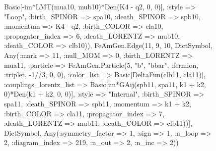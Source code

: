 \documentclass{revtex4}
\begin{document}
\begin{figure}[!htb]
\begin{center}
{Basic[-im*LMT(mua10, mub10)*Den(K4 - q2, 0, 0)], :style => "Loop", :birth_SPINOR => spa10, :death_SPINOR => spb10, :momentum => K4 - q2, :birth_COLOR => cla10, :propagator_index => 6, :death_LORENTZ => mub10, :death_COLOR => clb10)), FeAmGen.Edge(11, 9, 10, Dict{Symbol, Any}(:mark => 11, :null_MOM => 0, :birth_LORENTZ => mua11, :particle => FeAmGen.Particle(5, "b", "bbar", :fermion, :triplet, -1//3, 0, 0), :color_list => Basic[DeltaFun(clb11, cla11)], :couplings_lorentz_list => Basic[im*GAij(spb11, spa11, k1 + k2, 0)*Den(k1 + k2, 0, 0)], :style => "Internal", :birth_SPINOR => spa11, :death_SPINOR => spb11, :momentum => k1 + k2, :birth_COLOR => cla11, :propagator_index => 7, :death_LORENTZ => mub11, :death_COLOR => clb11))], Dict{Symbol, Any}(:symmetry_factor => 1, :sign => 1, :n_loop => 2, :diagram_index => 219, :n_out => 2, :n_inc => 2)) 
}
\end{center}
\end{figure}
\end{document}
